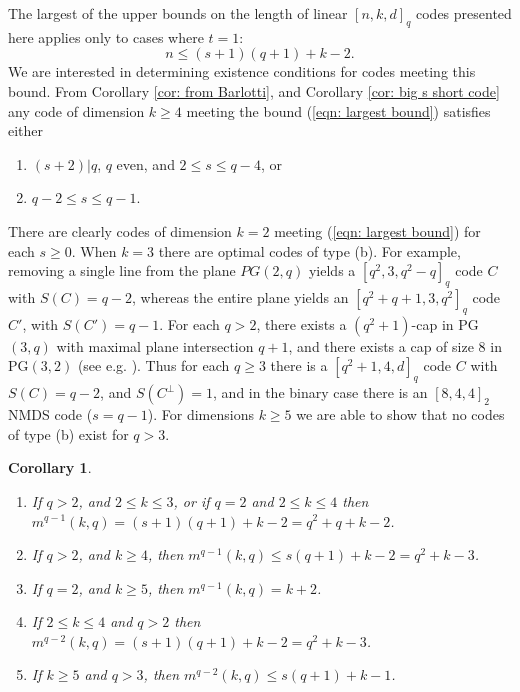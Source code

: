 \documentclass[11pt,a4paper]{amsart}
\theoremstyle{plain}
\newtheorem{corollary}[theorem]{Corollary}
\theoremstyle{definition}
\theoremstyle{remark}
\begin{document}
	The largest of the upper bounds on the length of linear $[n,k,d]_q$ codes presented here applies only to cases where $t=1$:
	\begin{equation} \label{eqn: largest bound}
		n\le (s+1)(q+1)+k-2.
	\end{equation}
	We are interested in determining existence conditions for codes meeting this bound. From Corollary \ref{cor: from Barlotti}, and Corollary \ref{cor: big s short code} any code of dimension $k\ge 4$ meeting the bound (\ref{eqn: largest bound}) satisfies either \begin{enumerate}
		\item[(a)] $(s+2)|q$,  $q$ even, and $2\le s \le q-4$, or
		\item[(b)] $q-2 \le s\le q-1$.
	\end{enumerate}
	There are clearly codes of dimension $k=2$ meeting (\ref{eqn: largest bound}) for each $s\ge 0$. When $k=3$ there are optimal codes of type (b). For example, removing a single line from the plane $PG(2,q)$ yields a $[q^2,3,q^2-q]_q$ code $C$ with $S(C)=q-2$, whereas the entire plane yields an $[q^2+q+1, 3, q^2]_q$ code $C'$, with $S(C')=q-1$. For each $q>2$, there exists a $(q^2+1)$-cap in PG$(3,q)$ with maximal plane intersection $q+1$, and there exists a  cap of size $8$ in PG$(3,2)$  (see e.g. \cite{MR840877}). Thus for each $q\ge 3$ there is a $[q^2+1,4,d]_q$ code $C$ with $S(C)=q-2$, and $S(C^\perp)=1$, and in the binary case there is an $[8,4,4]_2$ NMDS code ($s=q-1$). For dimensions $k\ge 5$ we are able to show that no codes of type (b) exist for $q>3$.
	\begin{corollary} \label{cor: q-1 and q-2} \phantom{ }
		\begin{enumerate}
			\item If $q>2$, and $2\le k \le 3$, or if $q=2$ and $2\le k \le 4$ then $m^{q-1}(k,q)=(s+1)(q+1)+k-2 = q^2+q+k-2$. \label{part: 1 cor: q-1 and q-2}
			\item If $q>2$, and $k\ge 4$,  then $m^{q-1}(k,q)\le s(q+1)+k-2 = q^2+k-3$. \label{part: 2 cor: q-1 and q-2}
			\item If $q=2$, and $k\ge 5$, then $m^{q-1}(k,q) = k+2$. \label{part: 3 cor: q-1 and q-2}
			\item If $2\le k\le 4$ and $q>2$  then $m^{q-2}(k,q)=(s+1)(q+1)+k-2 = q^2+k-3$. \label{part: 4 cor: q-1 and q-2}
			\item If $k\ge 5$ and $q>3$,  then $m^{q-2}(k,q)\le s(q+1)+k-1$. \label{part: 5 cor: q-1 and q-2}
		\end{enumerate}
	\end{corollary}
\end{document}
